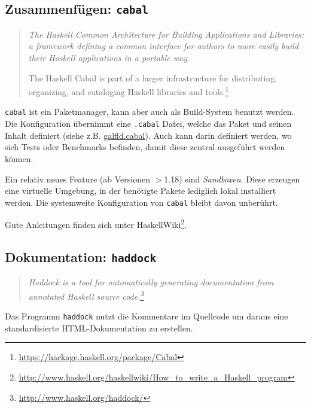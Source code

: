 \subsection{Zusammenfügen: \texttt{cabal}}
\begin{quote}\itshape
  The Haskell Common Architecture for Building Applications and Libraries: a
  framework defining a common interface for authors to more easily build their
  Haskell applications in a portable way.

  The Haskell Cabal is part of a larger infrastructure for distributing,
  organizing, and cataloging Haskell libraries and
  tools.\footnote{\url{https://hackage.haskell.org/package/Cabal}}
\end{quote}
\texttt{cabal} ist ein Paketmanager, kann aber auch als Build-System benutzt
werden. Die
Konfiguration übernimmt eine \texttt{.cabal} Datei, welche
das Paket und seinen Inhalt definiert (siehe z.B. \url{galfld.cabal}).
Auch kann darin definiert werden, wo sich Tests oder Benchmarks befinden, 
damit diese zentral ausgeführt werden können.

Ein relativ neues  Feature (ab Versionen $>$1.18) sind \emph{Sandboxen}.
Diese erzeugen eine virtuelle Umgebung, in der benötigte Pakete lediglich lokal
installiert werden. Die systemweite Konfiguration von \texttt{cabal} bleibt
davon unberührt.

Gute Anleitungen finden sich unter
HaskellWiki\footnote{\url{http://www.haskell.org/haskellwiki/How_to_write_a_Haskell_program}}.

\subsection{Dokumentation: \texttt{haddock}}
\begin{quote}\itshape
  Haddock is a tool for automatically generating documentation from annotated
  Haskell source code.\footnote{\url{http://www.haskell.org/haddock/}}
\end{quote}
Das Programm \texttt{haddock} nutzt die Kommentare im Quellcode 
um daraus eine standardisierte HTML-Dokumentation zu erstellen.

